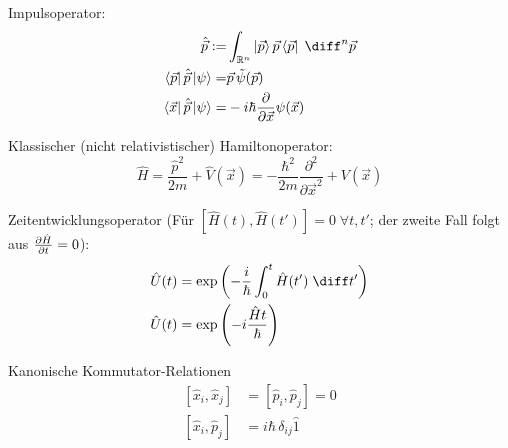 \documentclass[11pt]{article}
\DeclareMathOperator*{\SumInt}{%
\mathchoice%
  {\ooalign{$\displaystyle\sum$\cr\hidewidth$\displaystyle\int$\hidewidth\cr}}
  {\ooalign{\raisebox{.14\height}{\scalebox{.7}{$\textstyle\sum$}}\cr\hidewidth$\textstyle\int$\hidewidth\cr}}
  {\ooalign{\raisebox{.2\height}{\scalebox{.6}{$\scriptstyle\sum$}}\cr$\scriptstyle\int$\cr}}
  {\ooalign{\raisebox{.2\height}{\scalebox{.6}{$\scriptstyle\sum$}}\cr$\scriptstyle\int$\cr}}
}
\numberwithin{equation}{section}
\begin{document}
      Impulsoperator:
      \begin{equation}
        \begin{aligned}
          \hat{\vec{p}} :=& \int_{\mathbb{R}^n} \Ket{\vec{p}} \vec{p} \Bra{\vec{p}}\;\diff^n\vec{p} \\
          \Bra{\vec{p}}\hat{\vec{p}}\Ket{\psi} =& \vec{p}\, \tilde{\psi}(\vec{p}) \\
          \Bra{\vec{x}}\hat{\vec{p}}\Ket{\psi} =& -i\hbar\pder{}{\vec{x}} \psi(\vec{x}) \\
        \end{aligned}
      \end{equation}

      Klassischer (nicht relativistischer) Hamiltonoperator:
      \begin{equation}
        \hat{H} = \frac{\hat{p}^2}{2m}+\hat{V}(\vec{x}) = -\frac{\hbar^2}{2m}\frac{\partial^2}{\partial \vec{x}^2} + V(\vec{x})
      \end{equation}

      Zeitentwicklungsoperator (Für $\left[\hat{H}(t),\hat{H}(t')\right] = 0\;\forall t,t'$; der zweite Fall folgt aus $\frac{\partial \hat{H}}{\partial t}=0$):
      \begin{equation}
        \begin{aligned}
          \hat{U}(t) &= \exp{\left(-\frac{i}{\hbar}\int_0^t \hat{H}(t')\;\diff t'\right)} \\
          \hat{U}(t) &= \exp{\left(-i\frac{\hat{H} t}{\hbar}\right)} \\
        \end{aligned}
      \end{equation}

      Kanonische Kommutator-Relationen
      \begin{equation}
        \begin{aligned}
          \left[ \hat{x}_i, \hat{x}_j \right] &= \left[ \hat{p}_i, \hat{p}_j \right] = 0 \\
          \left[ \hat{x}_i, \hat{p}_j \right] &= i\hbar\, \delta_{ij}\hat{1} \\
        \end{aligned}
      \end{equation}
\end{document}

